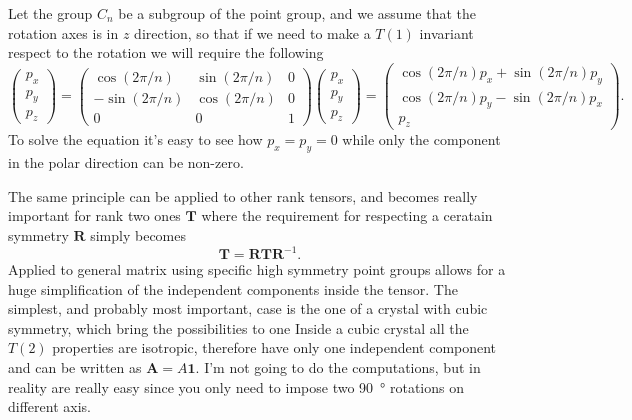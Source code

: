 {
    Let the group $C_n$ be a subgroup of the point group, and we assume that the rotation axes is in $z$ direction, so that if we need to make a $T(1)$ invariant respect to the rotation we will require the following
    \begin{equation}
        \begin{pmatrix}
            p_x\\
            p_y\\
            p_z
        \end{pmatrix} = \begin{pmatrix}
            \cos(2\pi/n) & \sin(2\pi/n) & 0\\
            -\sin(2\pi/n)  &\cos(2\pi/n) & 0\\
            0  & 0 &1
        \end{pmatrix}
        \begin{pmatrix}
            p_x\\
            p_y\\
            p_z
        \end{pmatrix} = \begin{pmatrix}
            \cos(2\pi/n)p_x + \sin(2\pi/n)p_y\\
            \cos(2\pi/n)p_y - \sin(2\pi/n)p_x\\
            p_z
        \end{pmatrix}.
    \end{equation}
    To solve the equation it's easy to see how $p_x = p_y = 0$ while only the component in the polar direction can be non-zero.
}

The same principle can be applied to other rank tensors, and becomes really important for rank two ones $\mathbf{T}$ where the requirement for respecting a ceratain symmetry $\mathbf{R}$ simply becomes
\begin{equation}
    \mathbf{T} = \mathbf{R}\mathbf{T}\mathbf{R}^{-1}.
\end{equation}
Applied to general matrix using specific high symmetry point groups allows for a huge simplification of the independent components inside the tensor. The simplest, and probably most important, case is the one of a crystal with cubic symmetry, which bring the possibilities to one
\cor{}
{
    Inside a cubic crystal all the $T(2)$ properties are isotropic, therefore have only one independent component and can be written as $\mathbf{A} = A\mathbf{1}$.
}
\noindent
I'm not going to do the computations, but in reality are really easy since you only need to impose two \SI{90}{\degree} rotations on different axis. 

